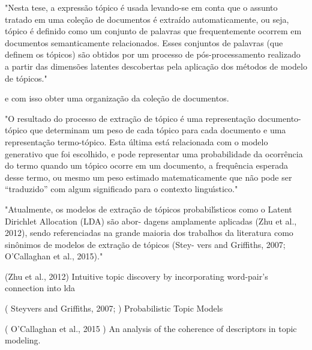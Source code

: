 "Nesta tese, a expressão tópico é usada levando-se em conta que o assunto tratado em uma coleção de documentos é extraído automaticamente, ou seja, tópico é definido como um conjunto de palavras que frequentemente ocorrem em documentos semanticamente relacionados. Esses conjuntos de palavras (que definem os tópicos) são obtidos por um processo de pós-processamento realizado a partir das dimensões latentes descobertas pela aplicação dos métodos de modelo de tópicos."  



e com isso obter uma organização da coleção de documentos.











"O resultado do processo de extração de tópico é uma representação documento-tópico que determinam um peso de cada tópico para cada documento e uma representação termo-tópico. Esta última está relacionada com o modelo generativo que foi escolhido, e pode representar uma probabilidade da ocorrência do termo quando um tópico ocorre em um documento, a frequência esperada desse termo, ou mesmo um peso estimado matematicamente que não pode ser “traduzido” com algum significado para o contexto linguı́stico."



"Atualmente, os modelos de extração de tópicos probabilı́sticos como o Latent Dirichlet Allocation (LDA) são abor- dagens amplamente aplicadas (Zhu et al., 2012), sendo referenciadas na grande maioria dos trabalhos da literatura como sinônimos de modelos de extração de tópicos (Stey- vers and Griffiths, 2007; O’Callaghan et al., 2015)."  

(Zhu et al., 2012)
Intuitive topic discovery by incorporating word-pair’s connection into lda

( Steyvers and Griffiths, 2007; )
Probabilistic Topic Models

( O’Callaghan et al., 2015 )
An analysis of the coherence of descriptors in topic modeling.







